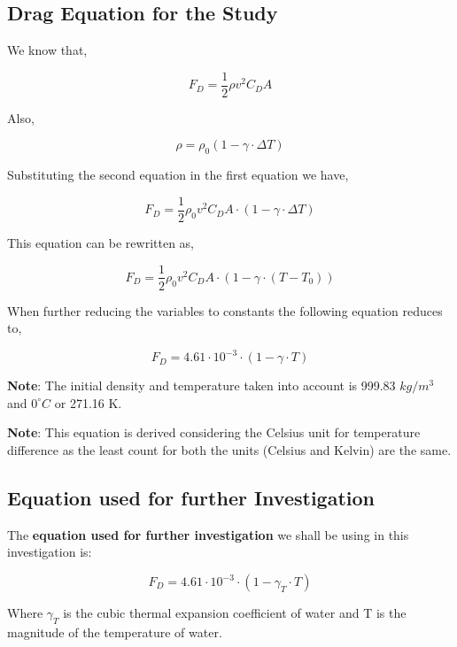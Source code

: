 
\subsection{{Drag Equation for the Study}}
            
   {We know that,}
            
		$$F_D = \frac{1}{2}\rho v^2C_DA$$

	{Also,}
		
		$$\rho = \rho_{0}\left(1 - \gamma\cdot\Delta T\right)$$

	{Substituting the second equation in the first equation we have,}
	
		$$F_D = \frac{1}{2}\rho_{0}v^2C_DA\cdot\left(1 - \gamma\cdot\Delta T\right)$$

	{This equation can be rewritten as,}

		$$F_D = \frac{1}{2}\rho_{0}v^2C_DA\cdot\left(1 - \gamma\cdot\left(T - T_{0}\right)\right)$$

	{When further reducing the variables to constants the following equation reduces to,}

		$$F_D = 4.61\cdot 10^{-3}\cdot\left(1 - \gamma\cdot T\right)$$

	{\textbf{Note}: The initial density and temperature taken into account is 999.83 $kg/m^3$ and ${0}^\circ C$ or 271.16 K.}

	{\textbf{Note}: This equation is derived considering the Celsius unit for temperature difference as the least count for both the units (Celsius and Kelvin) are the same.}

\subsection{{Equation used for further Investigation}}

	{The \textbf{equation used for further investigation} we shall be using in this investigation is:}
            
   	\begin{equation}
      	F_D = 4.61\cdot 10^{-3}\cdot\left(1 - \gamma_{T}\cdot T\right)
      	\label{eq1}
    	\end{equation}
            
	{Where $\gamma_{T}$ is the cubic thermal expansion coefficient of water and T is the magnitude of the temperature of water.}
            
            
            




